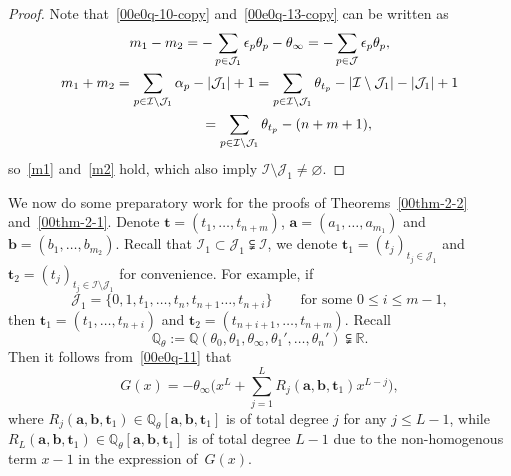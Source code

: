 \documentclass[pdftex]{sigma}
\numberwithin{equation}{section}
\def\Q{\mathbb Q}
\def\R{\mathbb R}
\begin{document}
\begin{proof} Note that~\eqref{00e0q-10-copy} and~\eqref{00e0q-13-copy} can be written as
\begin{gather*}
m_1-m_2=-\sum_{p\in\mathcal{J}_1}\epsilon_p\theta_p-\theta_\infty=-\sum_{p\in\mathcal{J}}\epsilon_p\theta_p,\\
m_1+m_2 =\sum_{p\in \mathcal{I}\setminus\mathcal{J}_1}{\alpha}_{p}-|\mathcal{J}_1|+1=\sum_{p\in \mathcal{I}\setminus\mathcal{J}_1}\theta_{t_p}-|\mathcal{I}\setminus\mathcal{J}_1|-|\mathcal{J}_1|+1\\
\hphantom{m_1+m_2}{}
=\sum_{p\in \mathcal{I}\setminus\mathcal{J}_1}\theta_{t_p}-(n+m+1),
\end{gather*}
so~\eqref{m1} and~\eqref{m2} hold, which
also imply $\mathcal{I}\setminus \mathcal{J}_1\neq\varnothing$.
\end{proof}

We now do some preparatory work for the proofs of Theorems~\ref{00thm-2-2} and~\ref{00thm-2-1}.
Denote $\boldsymbol t=(t_1,\dots,t_{n+m})$,
$\boldsymbol
a=(a_1,\dots,a_{m_1})$ and $\boldsymbol b=(b_1,\dots,b_{m_2})$.
Recall that $\mathcal{I}_1\subset\mathcal{J}_1\subsetneqq \mathcal{I}$, we denote
$\boldsymbol t_1=(t_j)_{t_j\in \mathcal{J}_1}$ and $\boldsymbol
t_2=(t_j)_{t_j\in \mathcal{I}\setminus\mathcal{J}_1}$ for
convenience. For example, if
\[
 \mathcal{J}_1=\{0,1,t_1,\dots, t_n, t_{n+1}\dots, t_{n+i}\}
 \qquad\text{for some $0\leq i\leq m-1$},
\]
then $\boldsymbol t_1=(t_1,\dots,t_{n+i})$ and $\boldsymbol
t_2=(t_{n+i+1},\dots, t_{n+m})$. Recall
\[
 \Q_{\theta}:=\Q(\theta_0,\theta_1,\theta_\infty,\theta_1',
 \dots,\theta_n')\subsetneqq\R.
\]
 Then
it follows from~\eqref{00e0q-11} that
\begin{equation}\label{g111111}
G(x)=-\theta_{\infty}\Bigg(x^{L}+\sum_{j=1}^{L}R_j(\boldsymbol a,\boldsymbol b,\boldsymbol t_1)x^{L-j}\Bigg),
\end{equation}
where %
$R_j(\boldsymbol a,\boldsymbol b,\boldsymbol t_1)\in\mathbb{Q}_{\theta}[\boldsymbol a,\boldsymbol b,\boldsymbol t_1] $ is of total degree $j$ for any $j\leq L-1$, while $R_L(\boldsymbol a,\boldsymbol b, \boldsymbol t_1)\in\mathbb{Q}_{\theta}[\boldsymbol a,\boldsymbol b,\boldsymbol t_1] $ is of total degree $L-1$ due to the non-homogenous term $x-1$ in the expression of~$G(x)$.
\end{document}
